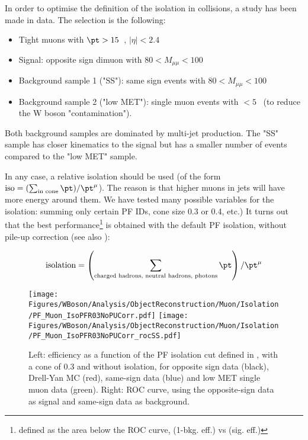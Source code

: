 In order to optimise the definition of the isolation in \pPb collisions, a study has been made in data. The selection is the following:

  \begin{itemize}
   \item Tight muons with $\pt>15$~\GeVc, $|\eta|<2.4$
   \item Signal: opposite sign dimuon with $80<M_{\mu\mu}<100$~\GeVcc
   \item Background sample 1 ("SS"): same sign events with $80<M_{\mu\mu}<100$~\GeVcc
   \item Background sample 2 ("low MET"): single muon events with \ETslash $<5$~ \GeVc (to reduce the W boson "contamination").
  \end{itemize}
  
Both background samples are dominated by multi-jet production. The "SS" sample has closer kinematics to the signal but has a smaller number of events compared to the "low MET" sample.

In any case, a relative isolation should be used (of the form  $\text{iso} = (\sum_\text{in cone} \pt) / \pt^\mu$). The reason is that higher \pt muons in jets will have more energy around them.
We have tested many possible variables for the isolation: summing only certain PF IDs, cone size 0.3 or 0.4, etc.) It turns out that the best performance\footnote{defined as the area below the ROC curve, (1-bkg. eff.) vs (sig. eff.)} is obtained with the default PF isolation, without pile-up correction (see also ):

 \begin{equation}
 \label{eq:iso}
  \text{isolation} = \left(\sum_\text{charged hadrons, neutral hadrons, photons} \pt\right) / \pt^\mu
 \end{equation}

\begin{figure}[htbp]
 \begin{center}
  \texttt{[image: Figures/WBoson/Analysis/ObjectReconstruction/Muon/Isolation/PF\_Muon\_IsoPFR03NoPUCorr.pdf]}\hspace{0.1\textwidth}
  \texttt{[image: Figures/WBoson/Analysis/ObjectReconstruction/Muon/Isolation/PF\_Muon\_IsoPFR03NoPUCorr\_rocSS.pdf]}
 \end{center}
 
 \caption{\label{fig:isoPFR03NoPUCorr} Left: efficiency as a function of the PF isolation cut defined in , with a cone of 0.3 and without isolation, for opposite sign data (black), Drell-Yan MC (red), same-sign data (blue) and low MET single muon data (green). Right: ROC curve, using the opposite-sign data as signal and same-sign data as background.}
\end{figure}


